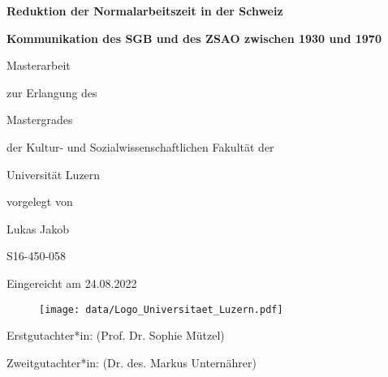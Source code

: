 \begin{titlepage}

\begin{center}

\Huge \textbf{Reduktion der Normalarbeitszeit in der Schweiz}

\Large \textbf{Kommunikation des SGB und des ZSAO zwischen 1930 und 1970}

\large Masterarbeit

\large zur Erlangung des

\large Mastergrades

\large der Kultur- und Sozialwissenschaftlichen Fakultät der

\large Universität Luzern



\large vorgelegt von



\large Lukas Jakob

\large S16-450-058

\large Eingereicht am 24.08.2022


\end{center}

\begin{figure}[!htbp]
		\begin{center}
			\texttt{[image: data/Logo\_Universitaet\_Luzern.pdf]}
		\end{center}
\end{figure}

\begin{flushleft}
\small Erstgutachter*in: (Prof. Dr. Sophie Mützel)

\small Zweitgutachter*in: (Dr. des. Markus Unternährer)
\end{flushleft}
\end{titlepage}